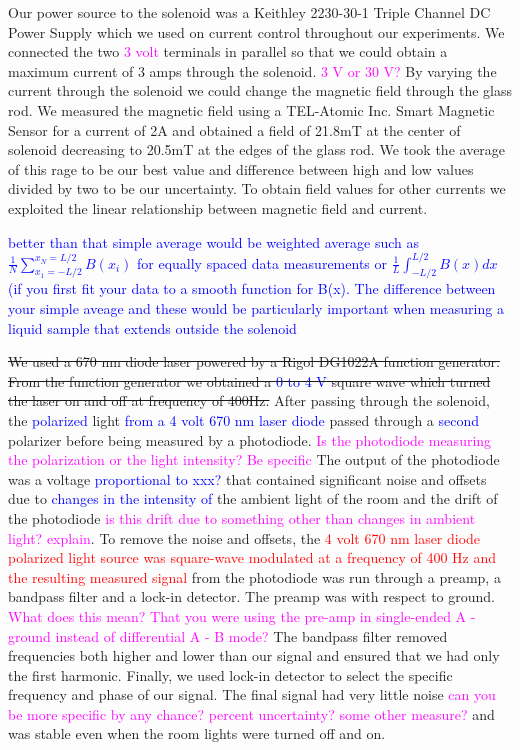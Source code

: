 \documentclass[prb,preprint]{revtex4-1}
\begin{document}
Our power source to the solenoid was a Keithley 2230-30-1 Triple Channel DC Power Supply which we used on current control throughout our experiments. We connected the two \textcolor{magenta}{3 volt}  terminals in parallel so that we could obtain a maximum current of 3 amps through the solenoid. \textcolor{magenta}{3 V or 30 V?} By varying the current through the solenoid we could change the magnetic field through the glass rod. We measured the magnetic field using a TEL-Atomic Inc. Smart Magnetic Sensor for a current of 2A and obtained a field of 21.8mT at the center of solenoid decreasing to 20.5mT at the edges of the glass rod. We took the average of this rage to be our best value and difference between high and low values divided by two to be our uncertainty. To obtain field values for other currents we exploited the linear relationship between magnetic field and current.

\textcolor{blue}{better than that simple average would be weighted average such as $\frac{1}{N} \sum_{x_1=-L/2}^{x_N = L/2}B(x_i)$  for equally spaced data measurements or  $\frac{1}{L} \int_{-L/2}^{L/2}B(x)dx$ (if you first fit your data to a smooth function for B(x). The difference between your simple aveage and these would be particularly important when measuring a liquid sample that extends outside the solenoid}


\sout{We used a 670 nm diode laser powered by a Rigol DG1022A function generator. From the function generator we obtained a \textcolor{blue}{0 to 4 V} square wave which turned the laser on and off at frequency of 400Hz. } After passing through the solenoid, the \textcolor{blue}{polarized} light \textcolor{blue}{from a 4 volt 670 nm laser diode } passed through a \textcolor{blue}{second} polarizer before being measured by a photodiode. \textcolor{magenta}{Is the photodiode measuring the polarization or the light intensity? Be specific} The output of the photodiode was a voltage \textcolor{blue}{proportional to xxx?}  that contained significant noise and offsets due to \textcolor{blue}{changes in the intensity of} the ambient light of the room and the drift of the photodiode \textcolor{magenta}{is this drift due to something other than changes in ambient light? explain}.  To remove the noise and offsets, the \textcolor{red}{4 volt 670 nm laser diode polarized light source was square-wave modulated at a frequency of 400 Hz and the resulting measured signal} from the photodiode was run through a preamp, a bandpass filter and a lock-in detector. The preamp  was with respect to ground. \textcolor{magenta}{What does this mean? That you were using the pre-amp in single-ended A - ground instead of differential A - B mode?} The bandpass filter removed frequencies both higher and lower than our signal and ensured that we had only the first harmonic. Finally, we used lock-in detector to select the specific frequency and phase of our signal. The final signal had very little noise \textcolor{magenta}{can you be more specific by any chance? percent uncertainty? some other measure? } and was stable even when the room lights were turned off and on. 
\end{document}
